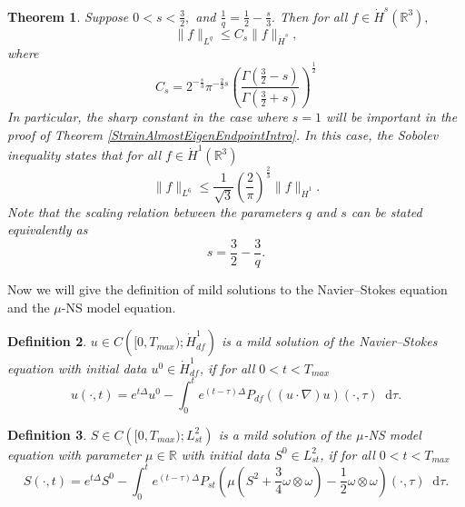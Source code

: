 \documentclass[11pt]{article}
\theoremstyle{plain}
\newtheorem{theorem}{Theorem}[section]
\newtheorem{definition}[theorem]{Definition}
\theoremstyle{remark}
\numberwithin{equation}{section}
\newcommand{\diff}{\mathop{}\!\mathrm{d}}
\begin{document}
\begin{theorem} \label{Sobolev}
    Suppose $0<s<\frac{3}{2},$ and 
    $\frac{1}{q}=\frac{1}{2}-\frac{s}{3}.$
    Then for all 
    $f\in\dot{H}^s\left(\mathbb{R}^3\right),$
    \begin{equation}
        \|f\|_{L^q}\leq C_s \|f\|_{\dot{H}^s},
    \end{equation}
    where
    \begin{equation}
        C_s=2^{-\frac{s}{3}}\pi^{-\frac{2}{3}s}
        \left(\frac{\Gamma\left(\frac{3}{2}-s\right)}
        {\Gamma\left(\frac{3}{2}+s\right)}
        \right)^\frac{1}{2}
    \end{equation}
    In particular, the sharp constant in the case where $s=1$
    will be important in the proof of Theorem \ref{StrainAlmostEigenEndpointIntro}.
    In this case, the Sobolev inequality states that for all 
    $f\in\dot{H}^1\left(\mathbb{R}^3\right)$
\begin{equation}
    \|f\|_{L^6}\leq \frac{1}{\sqrt{3}} 
    \left(\frac{2}{\pi}\right)^\frac{2}{3}
    \|f\|_{\dot{H}^1}.
\end{equation}
    Note that the scaling relation between the parameters $q$ and $s$ can be stated equivalently as 
    \begin{equation}
        s=\frac{3}{2}-\frac{3}{q}.
    \end{equation}
\end{theorem}



Now we will give the definition of mild solutions to the Navier--Stokes equation and the $\mu$-NS model equation.

\begin{definition} \label{KatoMild}
$u\in C\left([0,T_{max}); \dot{H}^1_{df}\right)$ is a mild solution of the Navier--Stokes equation 
with initial data $u^0\in \dot{H}^1_{df}$, 
if for all $0<t<T_{max}$
\begin{equation}
    u(\cdot,t)= e^{t\Delta}u^0
    -\int_0^t e^{(t-\tau)\Delta} 
    P_{df}((u\cdot\nabla)u)(\cdot,\tau) \diff\tau.
\end{equation}
\end{definition}

\begin{definition}
$S\in C\left([0,T_{max}); L^2_{st}\right)$ is a mild solution of the $\mu$-NS model equation with parameter 
$\mu\in\mathbb{R}$
with initial data $S^0\in L^2_{st}$, 
if for all $0<t<T_{max}$
\begin{equation}
    S(\cdot,t)= e^{t\Delta}S^0
    -\int_0^t e^{(t-\tau)\Delta} 
    P_{st}\left(\mu\left(S^2
    +\frac{3}{4}\omega\otimes\omega\right)
    -\frac{1}{2}\omega\otimes\omega
    \right)(\cdot,\tau) \diff\tau.
\end{equation}
\end{definition}
\end{document}
